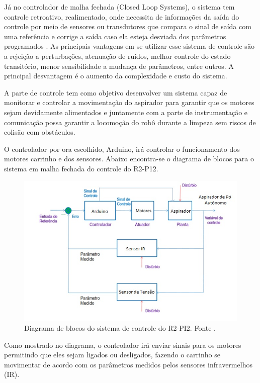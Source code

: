 		Já no controlador de malha fechada (Closed Loop Systems), o sistema tem controle retroativo, realimentado, onde necessita de informações da saída do controle por meio de sensores ou transdutores que compara o sinal de saída com uma referência e corrige a saída caso ela esteja desviada dos parâmetros programados \cite{silva}. As principais vantagens em se utilizar esse sistema de controle são a rejeição a perturbações, atenuação de ruídos, melhor controle do estado transitório, menor sensibilidade a mudança de parâmetros, entre outros. A principal desvantagem é o aumento da complexidade e custo do sistema.


			A parte de controle tem como objetivo desenvolver um sistema capaz de monitorar e controlar a movimentação do aspirador para garantir que os motores sejam devidamente alimentados e juntamente com a parte de instrumentação e comunicação possa garantir a locomoção do robô durante a limpeza sem riscos de colisão com obstáculos.

			O controlador por ora escolhido, Arduino, irá controlar o funcionamento dos motores carrinho e dos sensores. Abaixo encontra-se o diagrama de blocos para o sistema em malha fechada do controle do R2-P12.

			\begin{figure}[H]
				\centering
				\includegraphics[scale=0.55]{figuras/diagrama_blocos_R2PI2.png}
				\caption{Diagrama de blocos do sistema de controle do R2-PI2. Fonte \cite{mello}.}
				\label{img:diagrama_sistema_controle}
			\end{figure}

			Como mostrado no diagrama, o controlador irá enviar sinais para os motores permitindo que eles sejam ligados ou desligados, fazendo o carrinho se movimentar de acordo com os parâmetros medidos pelos sensores infravermelhos (IR). 

